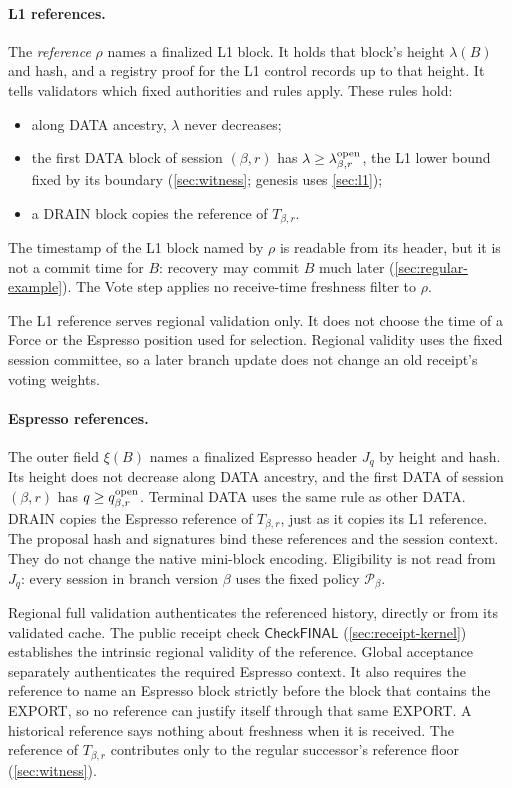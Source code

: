 \documentclass[11pt,a4paper]{article}
\newcommand{\tagg}[1]{\ensuremath{\mathsf{#1}}}
\newcommand{\defterm}[1]{\textcolor{rrBlue}{\textit{#1}}}
\begin{document}
\paragraph{L1 references.}
The \defterm{reference} $\rho$ names a finalized L1 block. It holds that
block's height $\lambda(B)$ and hash, and a registry proof for the L1
control records up to that height. It tells validators which fixed
authorities and rules apply. These rules hold:
\begin{itemize}
\item along DATA ancestry, $\lambda$ never decreases;
\item the first DATA block of session $(\beta,r)$ has $\lambda\ge
\lambda^{\rm open}_{\beta,r}$, the L1 lower bound fixed by its boundary
(\cref{sec:witness}; genesis uses \cref{sec:l1});
\item a DRAIN block copies the reference of $T_{\beta,r}$.
\end{itemize}
The timestamp of the L1 block named by $\rho$ is readable from its
header, but it is not a commit time for $B$: recovery may commit $B$
much later (\cref{sec:regular-example}). The Vote step applies no
receive-time freshness filter to $\rho$.

The L1 reference serves regional validation only. It does not choose
the time of a Force or the Espresso position used for selection.
Regional validity uses the fixed session committee, so a later branch
update does not change an old receipt's voting weights.

\paragraph{Espresso references.}
The outer field $\xi(B)$ names a finalized Espresso header $J_q$ by
height and hash. Its height does not decrease along DATA ancestry, and
the first DATA of session $(\beta,r)$ has
$q\ge q_{\beta,r}^{\rm open}$. Terminal DATA uses the same rule as other
DATA. DRAIN copies the Espresso reference of $T_{\beta,r}$, just as it
copies its L1 reference. The proposal hash and signatures bind these
references and the session context. They do not change the native
mini-block encoding. Eligibility is not read from $J_q$: every session
in branch version $\beta$ uses the fixed policy $\mathcal P_\beta$.

Regional full validation authenticates the referenced history, directly
or from its validated cache. The public receipt check \tagg{CheckFINAL}
(\cref{sec:receipt-kernel}) establishes the intrinsic regional validity
of the reference. Global acceptance separately authenticates the
required Espresso context. It also requires the reference to name an
Espresso block strictly before the block that contains the EXPORT, so no
reference can justify itself through that same EXPORT. A historical
reference says nothing about freshness when it is received. The
reference of $T_{\beta,r}$ contributes only to the regular successor's
reference floor (\cref{sec:witness}).
\end{document}
